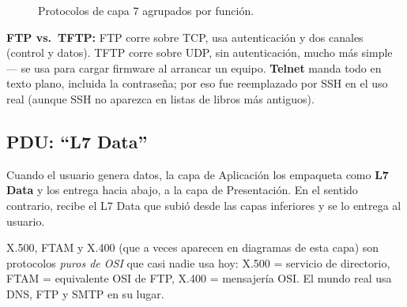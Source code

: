 \documentclass[11pt,a4paper]{article}
\begin{document}
\begin{figure}[h]
\centering
{}
\caption{Protocolos de capa 7 agrupados por función.}
\end{figure}

\textbf{FTP vs.\ TFTP:} FTP corre sobre TCP, usa autenticación y dos canales (control y datos). TFTP corre sobre UDP, sin autenticación, mucho más simple --- se usa para cargar firmware al arrancar un equipo. \textbf{Telnet} manda todo en texto plano, incluida la contraseña; por eso fue reemplazado por SSH en el uso real (aunque SSH no aparezca en listas de libros más antiguos).

\subsection*{PDU: ``L7 Data''}
Cuando el usuario genera datos, la capa de Aplicación los empaqueta como \textbf{L7 Data} y los entrega hacia abajo, a la capa de Presentación. En el sentido contrario, recibe el L7 Data que subió desde las capas inferiores y se lo entrega al usuario.

\begin{examfact}
X.500, FTAM y X.400 (que a veces aparecen en diagramas de esta capa) son protocolos \emph{puros de OSI} que casi nadie usa hoy: X.500 = servicio de directorio, FTAM = equivalente OSI de FTP, X.400 = mensajería OSI. El mundo real usa DNS, FTP y SMTP en su lugar.
\end{examfact}
\end{document}
